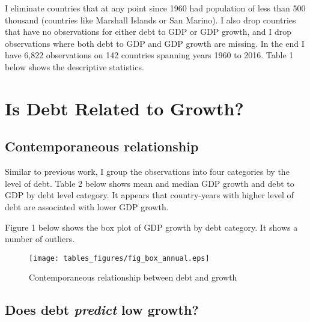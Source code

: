 \documentclass[letterpaper,11pt]{article}
\begin{document}
I eliminate countries that at any point since 1960 had population of less than 500 thousand (countries like Marshall Islands or San Marino). I also drop countries that have no observations for either debt to GDP or GDP growth, and I drop observations where both debt to GDP and GDP growth are missing. In the end I have 6,822 observations on 142 countries spanning years 1960 to 2016. Table 1 below shows the descriptive statistics.




\section{Is Debt Related to Growth?}
\subsection{Contemporaneous relationship}

Similar to previous work, I group the observations into four categories by the level of debt. Table 2 below shows mean and median GDP growth and debt to GDP by debt level category. It appears that country-years with higher level of debt are associated with lower GDP growth.



Figure 1 below shows the box plot of GDP growth by debt category. It shows a number of outliers.

\begin{figure}[h!]
\centering
\texttt{[image: tables\_figures/fig\_box\_annual.eps]}
\caption{Contemporaneous relationship between debt and growth}
\end{figure}

\subsection{Does debt \emph{predict} low growth?}
\end{document}
